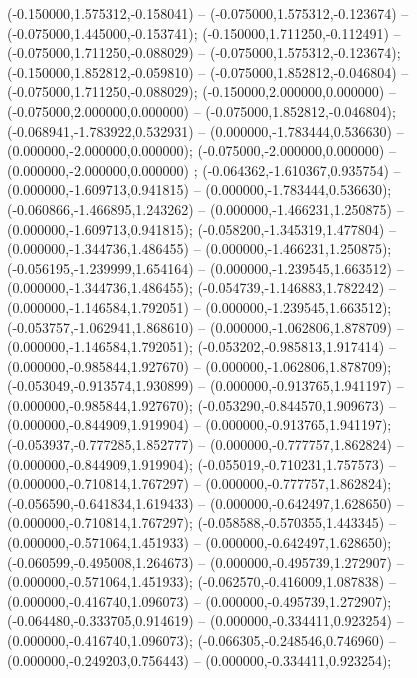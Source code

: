  (-0.150000,1.575312,-0.158041) -- (-0.075000,1.575312,-0.123674) -- (-0.075000,1.445000,-0.153741);
 (-0.150000,1.711250,-0.112491) -- (-0.075000,1.711250,-0.088029) -- (-0.075000,1.575312,-0.123674);
 (-0.150000,1.852812,-0.059810) -- (-0.075000,1.852812,-0.046804) -- (-0.075000,1.711250,-0.088029);
 (-0.150000,2.000000,0.000000) -- (-0.075000,2.000000,0.000000) -- (-0.075000,1.852812,-0.046804);
 (-0.068941,-1.783922,0.532931) -- (0.000000,-1.783444,0.536630) -- (0.000000,-2.000000,0.000000);
 (-0.075000,-2.000000,0.000000) -- (0.000000,-2.000000,0.000000) ;
 (-0.064362,-1.610367,0.935754) -- (0.000000,-1.609713,0.941815) -- (0.000000,-1.783444,0.536630);
 (-0.060866,-1.466895,1.243262) -- (0.000000,-1.466231,1.250875) -- (0.000000,-1.609713,0.941815);
 (-0.058200,-1.345319,1.477804) -- (0.000000,-1.344736,1.486455) -- (0.000000,-1.466231,1.250875);
 (-0.056195,-1.239999,1.654164) -- (0.000000,-1.239545,1.663512) -- (0.000000,-1.344736,1.486455);
 (-0.054739,-1.146883,1.782242) -- (0.000000,-1.146584,1.792051) -- (0.000000,-1.239545,1.663512);
 (-0.053757,-1.062941,1.868610) -- (0.000000,-1.062806,1.878709) -- (0.000000,-1.146584,1.792051);
 (-0.053202,-0.985813,1.917414) -- (0.000000,-0.985844,1.927670) -- (0.000000,-1.062806,1.878709);
 (-0.053049,-0.913574,1.930899) -- (0.000000,-0.913765,1.941197) -- (0.000000,-0.985844,1.927670);
 (-0.053290,-0.844570,1.909673) -- (0.000000,-0.844909,1.919904) -- (0.000000,-0.913765,1.941197);
 (-0.053937,-0.777285,1.852777) -- (0.000000,-0.777757,1.862824) -- (0.000000,-0.844909,1.919904);
 (-0.055019,-0.710231,1.757573) -- (0.000000,-0.710814,1.767297) -- (0.000000,-0.777757,1.862824);
 (-0.056590,-0.641834,1.619433) -- (0.000000,-0.642497,1.628650) -- (0.000000,-0.710814,1.767297);
 (-0.058588,-0.570355,1.443345) -- (0.000000,-0.571064,1.451933) -- (0.000000,-0.642497,1.628650);
 (-0.060599,-0.495008,1.264673) -- (0.000000,-0.495739,1.272907) -- (0.000000,-0.571064,1.451933);
 (-0.062570,-0.416009,1.087838) -- (0.000000,-0.416740,1.096073) -- (0.000000,-0.495739,1.272907);
 (-0.064480,-0.333705,0.914619) -- (0.000000,-0.334411,0.923254) -- (0.000000,-0.416740,1.096073);
 (-0.066305,-0.248546,0.746960) -- (0.000000,-0.249203,0.756443) -- (0.000000,-0.334411,0.923254);

